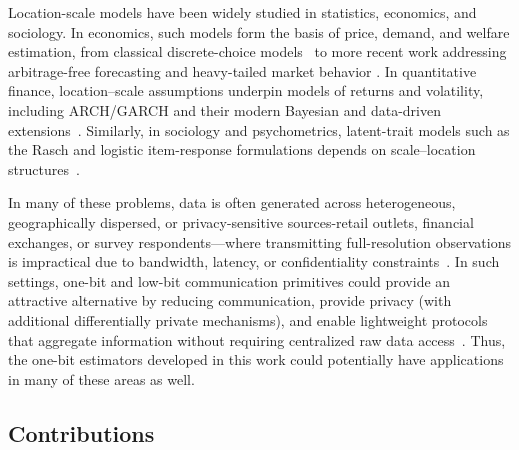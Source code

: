 \documentclass[10pt]{article} %
\theoremstyle{plain}
\theoremstyle{definition}
\theoremstyle{remark}
\newcommand{\rkcomment}[1]{\textcolor{blue}{RK: #1}}
\begin{document}

\par 
Location-scale models have been widely studied in statistics, economics, and sociology. In economics, such models form the basis of price, demand, and welfare estimation, from classical discrete-choice models~\cite{deaton1980economics, mcfadden1974conditional} to more recent work addressing arbitrage-free forecasting and heavy-tailed market behavior 
\cite{carvalho2018arbitrage, guggenberger2022robust}. In quantitative finance, location–scale assumptions underpin models of returns and volatility, including ARCH/GARCH and their modern Bayesian and data-driven extensions~\cite{bollerslev1987conditionally, campbell1997econometrics, yu2019bayesian, sirignano2019univer}. Similarly, in sociology and psychometrics, latent-trait models such as the Rasch and logistic item-response formulations depends on scale--location structures~\cite{rasch1960probabilistic, birnbaum1968logistic, jeon2019bayesian}. 

In many of these problems, data is often generated across heterogeneous, geographically dispersed, or privacy-sensitive sources-retail outlets, financial exchanges, or survey respondents—where transmitting full-resolution observations is impractical due to 
bandwidth, latency, or confidentiality constraints~\cite{suresh2017distributed, konevcny2016federated, duchi2018minimax}. In such settings, one-bit and low-bit communication primitives could provide an attractive alternative by reducing communication, provide privacy (with additional differentially private mechanisms), and enable lightweight protocols that aggregate information without requiring centralized raw data access~\cite{zhang2013information, braverman2016communication, dana2022onebit}. Thus, the one-bit estimators developed in this work could potentially have applications in many of these areas as well.






\subsection{Contributions}
\end{document}
